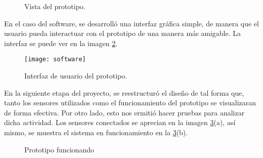\begin{figure}[H]
	\begin{center}
	\end{center}
	\label{hardwareda}
	\caption{Vista del prototipo.}
\end{figure} 

En el caso del software, se desarroll\'o una interfaz gr\'afica simple, de manera que el usuario pueda interactuar con el prototipo de una manera m\'as amigable. La interfaz se puede ver en la imagen \ref{software}.

\begin{figure}[H]
	\begin{center}
		\texttt{[image: software]}
	\end{center}
	\caption{Interfaz de usuario del prototipo.}
	\label{software}
\end{figure} 

En la siguiente etapa del proyecto, se reestructur\'o el dise\~no de tal forma que, tanto los sensores utilizados como el funcionamiento del prototipo se visualizaran de forma efectiva. Por otro lado, esto nos ermiti\'o hacer pruebas para analizar dicha actividad. Los sensores conectados se aprecian en la imagen \ref{hardwarep}(a), as\'i mismo, se muestra el sistema en funcionamiento en la \ref{hardwarep}(b).

\begin{figure}[H]
	\begin{center}
	\end{center}
	\label{hardwarep}
	\caption{Prototipo funcionando}
\end{figure}